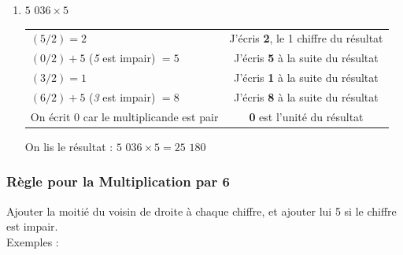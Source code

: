 \documentclass[a4paper, twoside]{article}
\begin{document}
\begin{small}
\begin{enumerate}
			\item $5$ $036 \times 5$
			
			\begin{tabular}{l|c}

				$(5 / 2) = 2$ & J'écris \textbf{2}, le 1\up{er} chiffre du résultat
				
				\tabularnewline
				
				$(0 / 2) + 5$ (\textit{5} est impair) $= 5$ & J'écris \textbf{5} à la suite du résultat
				
				\tabularnewline
				
				$(3 / 2) = 1$ & J'écris \textbf{1} à la suite du résultat
				
				\tabularnewline
				
				$(6 / 2) + 5$ (\textit{3} est impair) $= 8$ & J'écris \textbf{8} à la suite du résultat
				
				\tabularnewline
				
				On écrit 0 car le multiplicande est pair & \textbf{0} est l'unité du résultat
				
			\end{tabular}
			
			On lis le résultat : {\boldmath $5$ $036 \times 5 = 25$ $180$}\\
			

		\end{enumerate}
		\end{small}


		\vfill
		{\noindent \dotfill}


		\subsubsection*{Règle pour la Multiplication par 6}

		Ajouter la moitié du voisin de droite à chaque chiffre, et ajouter lui 5 si le chiffre est impair.\\

		{ \parindent=0.5cm Exemples : }
\end{document}
